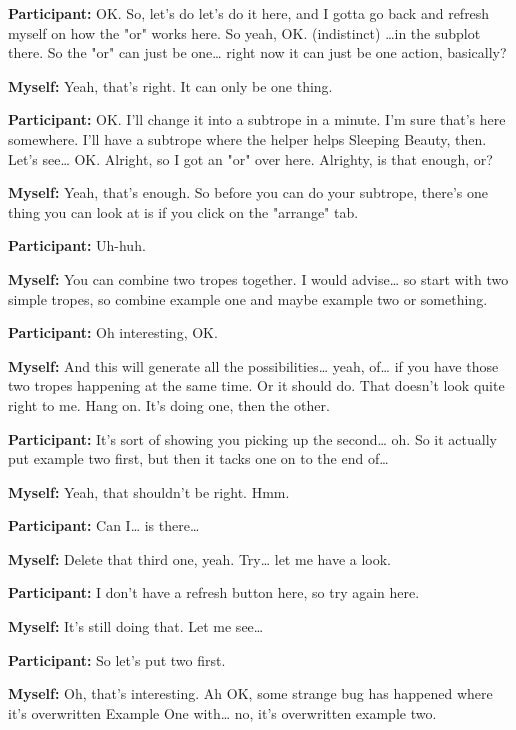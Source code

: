 \documentclass[11pt]{report}
\newcommand{\llabel}[1]{\hypertarget{llineno:#1}{\linelabel{#1}}}
\begin{document}
\begin{linenumbers}
\textbf{Participant:} OK. So, let's do let's do it here, and I gotta go back and
refresh myself on how the "or" works here. So yeah, OK. (indistinct) \ldots{}in
the subplot there. So the "or" can just be one\ldots{} right now it can just be
one action, basically?\llabel{lne:bug2g}

\textbf{Myself:} Yeah, that's right. It can only be one thing.

\textbf{Participant:} OK. I'll change it into a subtrope in a minute. I'm sure that's here somewhere. I'll have a subtrope where the helper helps Sleeping Beauty, then. Let's see\ldots{} OK. Alright, so I got an "or" over here. Alrighty, is that enough, or?

\textbf{Myself:} Yeah, that's enough. So before you can do your subtrope, there's one thing you can look at is if you click on the "arrange" tab.

\textbf{Participant:} Uh-huh.

\textbf{Myself:} You can combine two tropes together. I would advise\ldots{} so start with two simple tropes, so combine example one and maybe example two or something.

\textbf{Participant:} Oh interesting, OK.

\textbf{Myself:} And this will generate all the possibilities\ldots{} yeah, of\ldots{} if you have those two tropes happening at the same time. Or it should do. That doesn't look quite right to me. Hang on. It's doing one, then the other.

\textbf{Participant:} It's sort of showing you picking up the second\ldots{} oh. So it actually put example two first, but then it tacks one on to the end of\ldots{}

\textbf{Myself:} Yeah, that shouldn't be right. Hmm.

\textbf{Participant:} Can I\ldots{} is there\ldots{}

\textbf{Myself:} Delete that third one, yeah. Try\ldots{} let me have a look.

\textbf{Participant:} I don't have a refresh button here, so try again here.

\textbf{Myself:} It's still doing that. Let me see\ldots{}

\textbf{Participant:} So let's put two first.

\textbf{Myself:} Oh, that's interesting. Ah OK, some strange bug has happened where it's overwritten Example One with\ldots{} no, it's overwritten example two.


\end{linenumbers}
\end{document}
